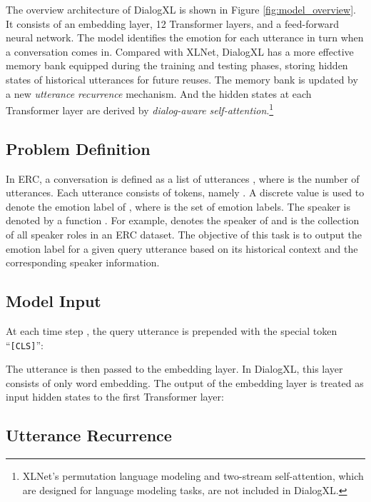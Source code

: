 \documentclass[letterpaper]{article} \usepackage{aaai21}  \usepackage{times}  \usepackage{helvet} \usepackage{courier}  \usepackage[hyphens]{url}  \usepackage{graphicx} \usepackage{amstext}
\begin{document}
The overview architecture of DialogXL is shown in Figure \ref{fig:model_overview}. It consists of an embedding layer, 12 Transformer layers, and a feed-forward neural network. The model identifies the emotion for each utterance in turn when a conversation comes in. Compared with XLNet, DialogXL has a more effective memory bank equipped during the training and testing phases, storing hidden states of historical utterances for future reuses. The memory bank is updated by a new \emph{utterance recurrence} mechanism. And the hidden states at each Transformer layer are derived by \emph{dialog-aware self-attention}.\footnote{XLNet's permutation language modeling and two-stream self-attention, which are designed for language modeling tasks, are not included in DialogXL.}

\subsection{Problem Definition}
In ERC, a conversation is defined as a list of utterances , where  is the number of utterances. Each utterance  consists of  tokens, namely . A discrete value  is used to denote the emotion label of , where  is the set of emotion labels. The speaker is denoted by a function . For example,  denotes the speaker of  and  is the collection of all speaker roles in an ERC dataset. The objective of this task is to output the emotion label  for a given query utterance  based on its historical context  and the corresponding speaker information.

\subsection{Model Input}
At each time step , the query utterance  is prepended with the special token ``\texttt{[CLS]}'':

The utterance is then passed to the embedding layer. In DialogXL, this layer consists of only word embedding. The output of the embedding layer is treated as input hidden states to the first Transformer layer:
 


\subsection{Utterance Recurrence}
\end{document}
